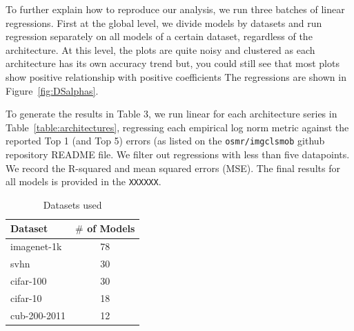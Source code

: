 To further explain how to reproduce our analysis, we run three batches of linear regressions. First at the global level, we divide models by datasets and run regression separately on all models of a certain dataset, regardless of the architecture. At this level, the plots are quite noisy and clustered as each architecture has its own accuracy trend but, you could still see that most plots show positive relationship with positive coefficients
The regressions are shown in Figure~\ref{fig:DSalphas}.

To generate the results in Table 3, we run linear for each architecture series in Table~\ref{table:architectures},
regressing each empirical log norm metric against the reported Top 1 (and Top 5) errors (as listed on the \texttt{osmr/imgclsmob} github 
repository README file. 
We filter out regressions with less than five datapoints.
We record the R-squared and mean squared errors (MSE). 
The final results for all models is provided in the \texttt{XXXXXX}.

\begin{table}[t]
\small
\begin{center}
\begin{tabular}{|p{1in}|c|}
\hline
Dataset & $\#$ of Models \\
\hline
imagenet-1k   &  78 \\
svhn          &  30 \\
cifar-100     &  30 \\
cifar-10      &  18 \\
cub-200-2011  &  12 \\
\hline
\end{tabular}
\end{center}
\caption{Datasets used}
\label{table:datasets}
\end{table}

